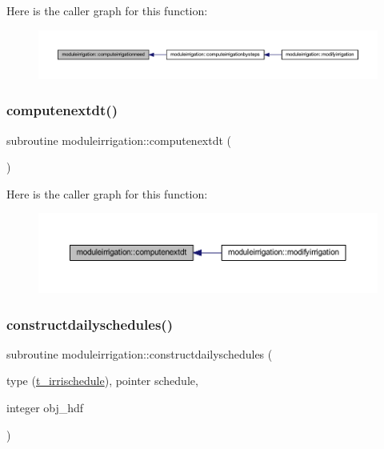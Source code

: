 Here is the caller graph for this function\+:\nopagebreak
\begin{figure}[H]
\begin{center}
\leavevmode
\includegraphics[width=350pt]{namespacemoduleirrigation_ada3092907de79d715950bd53c82fd943_icgraph}
\end{center}
\end{figure}
\mbox{\label{namespacemoduleirrigation_adfeefc8d9f9d754a3a3c503b77e8b3e9}} 
\subsubsection{\texorpdfstring{computenextdt()}{computenextdt()}}
{\footnotesize\ttfamily subroutine moduleirrigation\+::computenextdt (\begin{DoxyParamCaption}{ }\end{DoxyParamCaption})\hspace{0.3cm}{\ttfamily [private]}}

Here is the caller graph for this function\+:\nopagebreak
\begin{figure}[H]
\begin{center}
\leavevmode
\includegraphics[width=350pt]{namespacemoduleirrigation_adfeefc8d9f9d754a3a3c503b77e8b3e9_icgraph}
\end{center}
\end{figure}
\mbox{\label{namespacemoduleirrigation_af6e24627c25064683d994b7a6fc66c6d}} 
\subsubsection{\texorpdfstring{constructdailyschedules()}{constructdailyschedules()}}
{\footnotesize\ttfamily subroutine moduleirrigation\+::constructdailyschedules (\begin{DoxyParamCaption}\item[{type (\mbox{\hyperlink{structmoduleirrigation_1_1t__irrischedule}{t\+\_\+irrischedule}}), pointer}]{schedule,  }\item[{integer}]{obj\+\_\+hdf }\end{DoxyParamCaption})\hspace{0.3cm}{\ttfamily [private]}}

